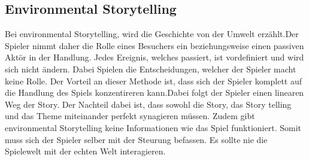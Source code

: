 \subsection*{Environmental Storytelling}
Bei environmental Storytelling, wird die Geschichte von der Umwelt erzählt.Der Spieler nimmt daher die Rolle eines Besuchers ein beziehungsweise einen passiven Aktör in der Handlung. Jedes Ereignis, welches passiert, ist vordefiniert und wird sich nicht ändern. Dabei Spielen die Entscheidungen, welcher der Spieler macht keine Rolle. Der Vorteil an dieser Methode ist, dass sich der Spieler komplett auf die Handlung des Spiels konzentireren kann.Dabei folgt der Spieler einen linearen Weg der Story. Der Nachteil dabei ist, dass sowohl die Story, das Story telling und das Theme miteinander perfekt synagieren müssen. Zudem gibt environmental Storytelling keine Informationen wie das Spiel funktioniert. Somit muss sich der Spieler selber mit der Steurung befassen. Es sollte nie die Spielewelt mit der echten Welt interagieren.

